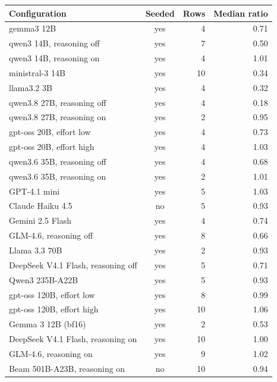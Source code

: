 \begin{tabular}{lcrr}
\toprule
Configuration & Seeded & Rows & Median ratio \\
\midrule
gemma3 12B & yes & 4 & 0.71 \\
qwen3 14B, reasoning off & yes & 7 & 0.50 \\
qwen3 14B, reasoning on & yes & 4 & 1.01 \\
ministral-3 14B & yes & 10 & 0.34 \\
llama3.2 3B & yes & 4 & 0.32 \\
qwen3.8 27B, reasoning off & yes & 4 & 0.18 \\
qwen3.8 27B, reasoning on & yes & 2 & 0.95 \\
gpt-oss 20B, effort low & yes & 4 & 0.73 \\
gpt-oss 20B, effort high & yes & 4 & 1.03 \\
qwen3.6 35B, reasoning off & yes & 4 & 0.68 \\
qwen3.6 35B, reasoning on & yes & 2 & 1.01 \\
GPT-4.1 mini & yes & 5 & 1.03 \\
Claude Haiku 4.5 & no & 5 & 0.93 \\
Gemini 2.5 Flash & yes & 4 & 0.74 \\
GLM-4.6, reasoning off & yes & 8 & 0.66 \\
Llama 3.3 70B & yes & 2 & 0.93 \\
DeepSeek V4.1 Flash, reasoning off & yes & 5 & 0.71 \\
Qwen3 235B-A22B & yes & 5 & 0.93 \\
gpt-oss 120B, effort low & yes & 8 & 0.99 \\
gpt-oss 120B, effort high & yes & 10 & 1.06 \\
Gemma 3 12B (bf16) & yes & 2 & 0.53 \\
DeepSeek V4.1 Flash, reasoning on & yes & 10 & 1.00 \\
GLM-4.6, reasoning on & yes & 9 & 1.02 \\
Beam 501B-A23B, reasoning on & no & 10 & 0.94 \\
\bottomrule
\end{tabular}
